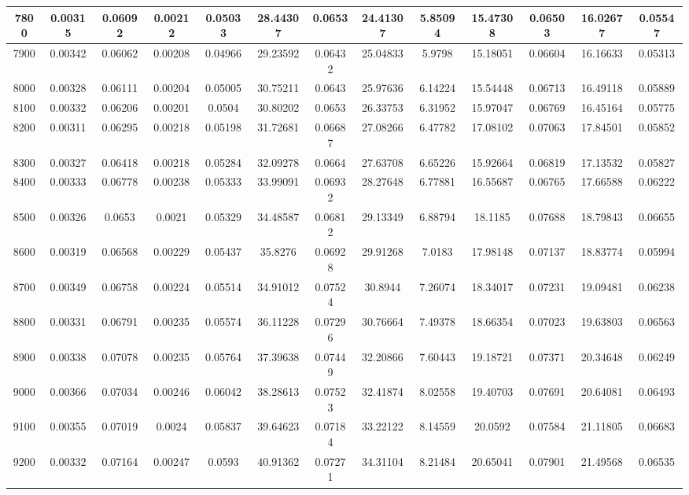 \documentclass[conference]{IEEEtran}
\begin{document}
\begin{table}[!ht]
\begin{tabular}{|c|c|c|c|c|c|c|c|c|c|c|c|c|}
\hline
7800 & 0.00315 & 0.06092 & 0.00212 & 0.05033 & 28.44307 & 0.0653 & 24.41307 & 5.85094 &15.47308 & 0.06503 & 16.02677 & 0.05547 \\
\hline
7900 & 0.00342 & 0.06062 & 0.00208 & 0.04966 & 29.23592 & 0.06432 & 25.04833 & 5.9798 &15.18051 & 0.06604 & 16.16633 & 0.05313 \\
\hline
8000 & 0.00328 & 0.06111 & 0.00204 & 0.05005 & 30.75211 & 0.0643 & 25.97636 & 6.14224 &15.54448 & 0.06713 & 16.49118 & 0.05889 \\
\hline
8100 & 0.00332 & 0.06206 & 0.00201 & 0.0504 & 30.80202 & 0.0653 & 26.33753 & 6.31952 &15.97047 & 0.06769 & 16.45164 & 0.05775 \\
\hline
8200 & 0.00311 & 0.06295 & 0.00218 & 0.05198 & 31.72681 & 0.06687 & 27.08266 & 6.47782 &17.08102 & 0.07063 & 17.84501 & 0.05852 \\
\hline
8300 & 0.00327 & 0.06418 & 0.00218 & 0.05284 & 32.09278 & 0.0664 & 27.63708 & 6.65226 &15.92664 & 0.06819 & 17.13532 & 0.05827 \\
\hline
8400 & 0.00333 & 0.06778 & 0.00238 & 0.05333 & 33.99091 & 0.06932 & 28.27648 & 6.77881 &16.55687 & 0.06765 & 17.66588 & 0.06222 \\
\hline
8500 & 0.00326 & 0.0653 & 0.0021 & 0.05329 & 34.48587 & 0.06812 & 29.13349 & 6.88794 &18.1185 & 0.07688 & 18.79843 & 0.06655 \\
\hline
8600 & 0.00319 & 0.06568 & 0.00229 & 0.05437 & 35.8276 & 0.06928 & 29.91268 & 7.0183 &17.98148 & 0.07137 & 18.83774 & 0.05994 \\
\hline
8700 & 0.00349 & 0.06758 & 0.00224 & 0.05514 & 34.91012 & 0.07524 & 30.8944 & 7.26074 &18.34017 & 0.07231 & 19.09481 & 0.06238 \\
\hline
8800 & 0.00331 & 0.06791 & 0.00235 & 0.05574 & 36.11228 & 0.07296 & 30.76664 & 7.49378 &18.66354 & 0.07023 & 19.63803 & 0.06563 \\
\hline
8900 & 0.00338 & 0.07078 & 0.00235 & 0.05764 & 37.39638 & 0.07449 & 32.20866 & 7.60443 &19.18721 & 0.07371 & 20.34648 & 0.06249 \\
\hline
9000 & 0.00366 & 0.07034 & 0.00246 & 0.06042 & 38.28613 & 0.07523 & 32.41874 & 8.02558 &19.40703 & 0.07691 & 20.64081 & 0.06493 \\
\hline
9100 & 0.00355 & 0.07019 & 0.0024 & 0.05837 & 39.64623 & 0.07184 & 33.22122 & 8.14559 &20.0592 & 0.07584 & 21.11805 & 0.06683 \\
\hline
9200 & 0.00332 & 0.07164 & 0.00247 & 0.0593 & 40.91362 & 0.07271 & 34.31104 & 8.21484 &20.65041 & 0.07901 & 21.49568 & 0.06535 \\

\end{tabular}
\end{table}
\end{document}
